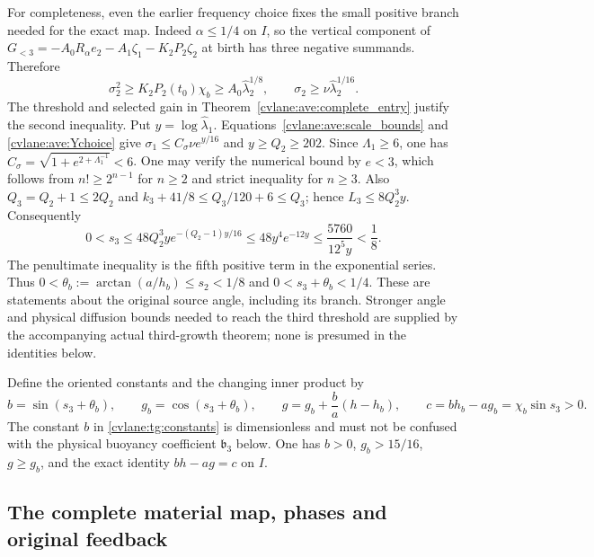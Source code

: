 For completeness, even the earlier frequency choice fixes the small
positive branch needed for the exact map. Indeed $\alpha\leq1/4$
on $I$, so the vertical component of
$G_{<3}=-A_0R_\alpha e_2-A_1\zeta_1-K_2P_2\zeta_2$
at birth has three negative summands. Therefore
\[
 \sigma_2^2\geq K_2P_2(t_0)\chi_b
 \geq A_0\widehat\lambda_2^{1/8},\qquad
 \sigma_2\geq\nu\widehat\lambda_2^{1/16}.
\]
The threshold and selected gain in Theorem~\ref{cvlane:ave:complete_entry}
justify the second inequality. Put $y=\log\widehat\lambda_1$.
Equations~\eqref{cvlane:ave:scale_bounds} and \eqref{cvlane:ave:Ychoice} give
$\sigma_1\leq C_\sigma\nu e^{y/16}$ and $y\geq Q_2\geq202$.
Since $\Lambda_1\geq6$, one has
$C_\sigma=\sqrt{1+e^{2+\Lambda_1^{-1}}}<6$.
One may verify the numerical bound by $e<3$, which follows from
$n!\geq2^{n-1}$ for $n\geq2$ and strict inequality for $n\geq3$.
Also $Q_3=Q_2+1\leq2Q_2$ and
$k_3+41/8\leq Q_3/120+6\leq Q_3$; hence
$L_3\leq8Q_2^3y$. Consequently
\begin{equation}\label{cvlane:tg:birth_angle}
 0<s_3\leq48Q_2^3y e^{-(Q_2-1)y/16}
 \leq48y^4e^{-12y}
 \leq\frac{5760}{12^5y}<\frac18.
\end{equation}
The penultimate inequality is the fifth positive term in the
exponential series. Thus $0<\theta_b:=\arctan(a/h_b)\leq s_2<1/8$
and $0<s_3+\theta_b<1/4$. These are statements about the original
source angle, including its branch. Stronger angle and physical
diffusion bounds needed to reach the third threshold are supplied
by the accompanying actual third-growth theorem; none is presumed
in the identities below.

Define the oriented constants and the changing inner product by
\begin{equation}\label{cvlane:tg:constants}
 b=\sin(s_3+\theta_b),\qquad g_b=\cos(s_3+\theta_b),\qquad
 g=g_b+\frac ba(h-h_b),\qquad
 c=bh_b-ag_b=\chi_b\sin s_3>0.
\end{equation}
The constant $b$ in \eqref{cvlane:tg:constants} is dimensionless and must not
be confused with the physical buoyancy coefficient $\mathfrak b_3$
below. One has $b>0$, $g_b>15/16$, $g\geq g_b$, and the exact identity
$bh-ag=c$ on $I$.

\subsection{The complete material map, phases and original feedback}

